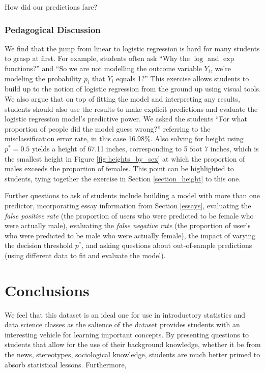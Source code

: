\documentclass{article}\usepackage[]{graphicx}\usepackage[]{color}
\begin{document}
How did our predictions fare?

\subsubsection{Pedagogical Discussion}
We find that the jump from linear to logistic regression is hard for many students to grasp at first.  For example, students often ask ``Why the $\log$ and $\exp$ functions?'' and ``So we are not modelling the outcome variable $Y_i$, we're modeling the probability $p_i$ that $Y_i$ equals 1?''  This exercise allows students to build up to the notion of logistic regression from the ground up using visual tools.  We also argue that on top of fitting the model and interpreting any results, students should also use the results to make explicit predictions and evaluate the logistic regression model's predictive power.  We asked the students ``For what proportion of people did the model guess wrong?'' referring to the misclassification error rate, in this case 16.98\%.  Also solving for height using $p^*=0.5$ yields a height of 67.11 inches, corresponding to 5 foot 7 inches, which is the smallest height in Figure \ref{fig:heights_by_sex} at which the proportion of males exceeds the proportion of females.  This point can be highlighted to students, tying together the exercise in Section \ref{section_height} to this one.

Further questions to ask of students include building a model with more than one predictor, incorporating essay information from Section \ref{essays}, evaluating the \textit{false positive rate} (the proportion of users who were predicted to be female who were actually male), evaluating the \textit{false negative rate} (the proportion of user's who were predicted to be male who were actually female), the impact of varying the decision threshold $p^*$, and asking questions about out-of-sample predictions (using different data to fit and evaluate the model).












%
\section{Conclusions}
%
We feel that this dataset is an ideal one for use in introductory statistics and data science classes as the salience of the dataset provides students with an interesting vehicle for learning important concepts.  By presenting questions to students that allow for the use of their background knowledge, whether it be from the news, stereotypes, sociological knowledge, students are much better primed to absorb statistical lessons.  Furthermore,
\end{document}

